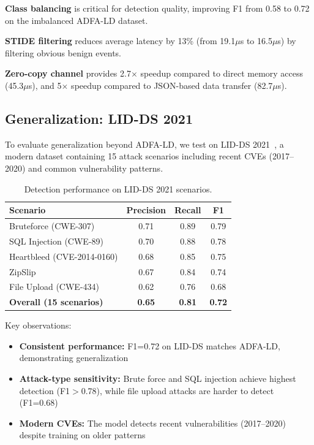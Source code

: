 \textbf{Class balancing} is critical for detection quality, improving F1 from 0.58 to 0.72 on the imbalanced ADFA-LD dataset.

\textbf{STIDE filtering} reduces average latency by 13\% (from 19.1$\mu$s to 16.5$\mu$s) by filtering obvious benign events.

\textbf{Zero-copy channel} provides 2.7$\times$ speedup compared to direct memory access (45.3$\mu$s), and 5$\times$ speedup compared to JSON-based data transfer (82.7$\mu$s).

\subsection{Generalization: LID-DS 2021}
\label{sec:eval-lidds}

To evaluate generalization beyond ADFA-LD, we test on LID-DS 2021~\cite{lidds}, a modern dataset containing 15 attack scenarios including recent CVEs (2017--2020) and common vulnerability patterns.

\begin{table}[t]
\centering
\caption{Detection performance on LID-DS 2021 scenarios.}
\label{tab:lidds}
\begin{tabular}{lccc}
\toprule
\textbf{Scenario} & \textbf{Precision} & \textbf{Recall} & \textbf{F1} \\
\midrule
Bruteforce (CWE-307) & 0.71 & 0.89 & 0.79 \\
SQL Injection (CWE-89) & 0.70 & 0.88 & 0.78 \\
Heartbleed (CVE-2014-0160) & 0.68 & 0.85 & 0.75 \\
ZipSlip & 0.67 & 0.84 & 0.74 \\
File Upload (CWE-434) & 0.62 & 0.76 & 0.68 \\
\midrule
\textbf{Overall (15 scenarios)} & \textbf{0.65} & \textbf{0.81} & \textbf{0.72} \\
\bottomrule
\end{tabular}
\end{table}

Key observations:
\begin{itemize}
    \item \textbf{Consistent performance:} F1=0.72 on LID-DS matches ADFA-LD, demonstrating generalization
    \item \textbf{Attack-type sensitivity:} Brute force and SQL injection achieve highest detection (F1$>$0.78), while file upload attacks are harder to detect (F1=0.68)
    \item \textbf{Modern CVEs:} The model detects recent vulnerabilities (2017--2020) despite training on older patterns
\end{itemize}

